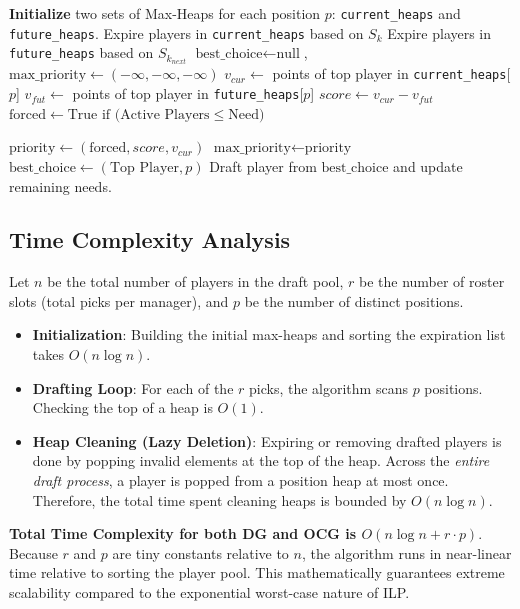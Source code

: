 \documentclass[11pt,a4paper]{article}
\begin{document}
\begin{algorithm}[H]
\caption{Opportunity Cost Greedy (OCG)}
\begin{algorithmic}[1]
\State \textbf{Initialize} two sets of Max-Heaps for each position $p$: \texttt{current\_heaps} and \texttt{future\_heaps}.
    \State Expire players in \texttt{current\_heaps} based on $S_k$
    \State Expire players in \texttt{future\_heaps} based on $S_{k_{next}}$
    \State $\text{best\_choice} \leftarrow \text{null}$, $\text{max\_priority} \leftarrow (-\infty, -\infty, -\infty)$
        \State $v_{cur} \leftarrow$ points of top player in \texttt{current\_heaps}[$p$]
        \State $v_{fut} \leftarrow$ points of top player in \texttt{future\_heaps}[$p$]
        \State $score \leftarrow v_{cur} - v_{fut}$ 
        \State $\text{forced} \leftarrow \text{True if (Active Players} \le \text{Need)}$
        
        \State $\text{priority} \leftarrow (\text{forced}, score, v_{cur})$
            \State $\text{max\_priority} \leftarrow \text{priority}$
            \State $\text{best\_choice} \leftarrow (\text{Top Player}, p)$
        \EndIf
    \EndFor
    \State Draft player from $\text{best\_choice}$ and update remaining needs.
\EndFor
\end{algorithmic}
\end{algorithm}

\subsection{Time Complexity Analysis}
Let $n$ be the total number of players in the draft pool, $r$ be the number of roster slots (total picks per manager), and $p$ be the number of distinct positions.
\begin{itemize}
    \item \textbf{Initialization}: Building the initial max-heaps and sorting the expiration list takes $O(n \log n)$.
    \item \textbf{Drafting Loop}: For each of the $r$ picks, the algorithm scans $p$ positions. Checking the top of a heap is $O(1)$.
    \item \textbf{Heap Cleaning (Lazy Deletion)}: Expiring or removing drafted players is done by popping invalid elements at the top of the heap. Across the \textit{entire draft process}, a player is popped from a position heap at most once. Therefore, the total time spent cleaning heaps is bounded by $O(n \log n)$.
\end{itemize}
\textbf{Total Time Complexity for both DG and OCG is $O(n \log n + r \cdot p)$}. Because $r$ and $p$ are tiny constants relative to $n$, the algorithm runs in near-linear time relative to sorting the player pool. This mathematically guarantees extreme scalability compared to the exponential worst-case nature of ILP.
\end{document}
